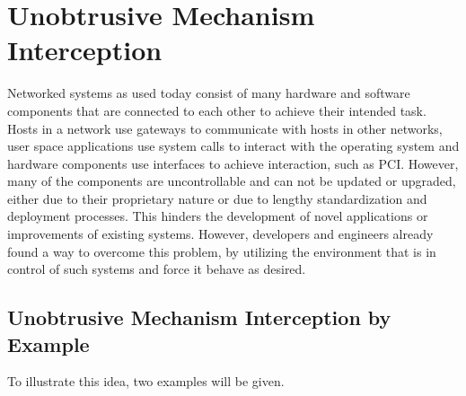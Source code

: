 \section{Unobtrusive Mechanism Interception}
\label{sec:design}

Networked systems as used today consist of many hardware and software components that are connected to each other to achieve their intended task.
Hosts in a network use gateways to communicate with hosts in other networks, user space applications use system calls to interact with the operating system and hardware components use interfaces to achieve interaction, such as PCI.
However, many of the components are uncontrollable and can not be updated or upgraded, either due to their proprietary nature or due to lengthy standardization and deployment processes.
This hinders the development of novel applications or improvements of existing systems.
However, developers and engineers already found a way to overcome this problem, by utilizing the environment that is in control of such systems and force it behave as desired.

\subsection{Unobtrusive Mechanism Interception by Example}
To illustrate this idea, two examples will be given.

